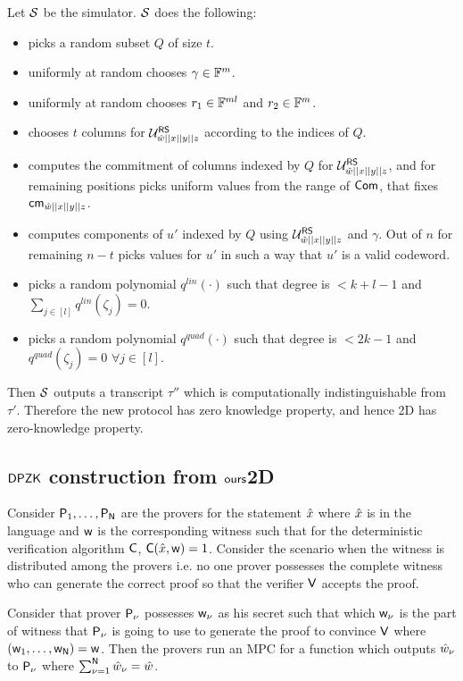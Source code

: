 Let $\mathcal{S}$ be the simulator. $\mathcal{S}$ does the following:
\begin{itemize}
	\item  picks a random subset $Q$ of size $t$.
	\item  uniformly at random chooses $\gamma \in \mathbb{F}^m$.
	\item  uniformly at random chooses $r_1 \in \mathbb{F}^{ml}$ and $r_2 \in \mathbb{F}^m$.
	\item  chooses $t$ columns for $\mathcal{U}^{\mathsf{RS}}_{\hat{w}||x||y||z}$ according to the indices of $Q$.
	\item  computes the commitment of columns indexed by $Q$ for $\mathcal{U}^{\mathsf{RS}}_{\hat{w}||x||y||z}$, and for remaining positions picks uniform values from the range of $\mathsf{Com}$, that fixes $\mathsf{cm}_{\hat{w}||x||y||z}$.
	\item  computes components of $u'$ indexed by $Q$ using $\mathcal{U}^{\mathsf{RS}}_{\hat{w}||x||y||z}$ and $\gamma$. Out of $n$ for remaining $n-t$ picks values for $u'$ in such a way that $u'$ is a valid codeword.
	\item  picks a random polynomial $q^{lin}(\cdot)$ such that degree is $<k+l-1$ and $\sum_{j\in [l]} q^{lin}(\zeta_j) = 0$.
	\item  picks a random polynomial $q^{quad}(\cdot)$ such that degree is $<2k-1$ and $q^{quad}(\zeta_j) = 0$ $\forall j\in [l]$.
\end{itemize} 
Then $\mathcal{S}$ outputs a transcript $\tau''$ which is computationally indistinguishable from $\tau'$. Therefore the new protocol has zero knowledge property, and hence \name2D has zero-knowledge property.

\subsection{$\mathsf{DPZK}$ construction from $\textsf{ours}$2D}

Consider $\mathsf{P}_1, \ldots, \mathsf{P}_{\mathsf{N}}$ are the provers for the statement $\hat{x}$ where $\hat{x}$ is in the language and $\mathsf{w}$ is the corresponding witness such that for the deterministic verification algorithm $\mathsf{C}$, $\mathsf{C}(\hat{x}, \mathsf{w})=1$. Consider the scenario when the witness is distributed among the provers i.e. no one prover possesses the complete witness who can generate the correct proof so that the verifier $\mathsf{V}$ accepts the proof.

Consider that prover $\mathsf{P}_{\nu}$ possesses $\mathsf{w}_{\nu}$ as his secret such that which $\mathsf{w}_{\nu}$ is the part of witness that $\mathsf{P}_{\nu}$ is going to use to generate the proof to convince $\mathsf{V}$ where $(\mathsf{w}_1,\ldots, \mathsf{w}_{\mathsf{N}})=\mathsf{w}$. Then the provers run an MPC for a function which outputs $\hat{w}_{\nu}$ to $\mathsf{P}_{\nu}$ where $\sum_{\nu=1}^{\mathsf{N}}\hat{w}_{\nu} = \hat{w}$.

